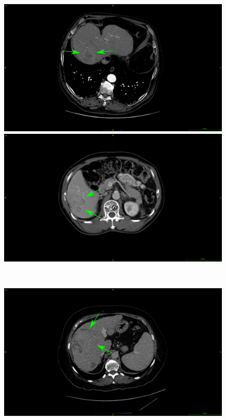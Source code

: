 {\begin{figure}[!ht]
\begin{mdframed}[backgroundcolor=blue!50,linecolor=blue!50]
\begin{minipage}{0.45\linewidth}
		\end{minipage} \\
		\begin{minipage}{0.45\linewidth}
			\includegraphics[width=\linewidth]{images/ImagingTraits/ResizeGDB_nonSmoothMargins}
		\end{minipage} \hspace{-0.1cm}
		\begin{minipage}{0.45\linewidth}
			\includegraphics[width=\linewidth]{images/ImagingTraits/ResizeTCIA_nonSmoothMargins}
		\end{minipage} \\
		\begin{minipage}{0.45\linewidth}
			\includegraphics[width=\linewidth]{images/ImagingTraits/ResizeGDB_halo}

\end{minipage}
\end{mdframed}
\end{figure}}
